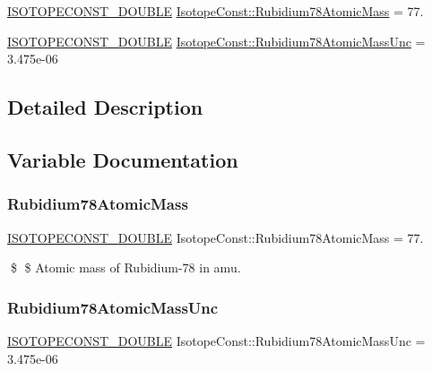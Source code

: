 \begin{DoxyCompactItemize}
\item 
\mbox{\hyperlink{group___isotope_const-_macros_ga8f45a7272ce02c0b4c65c44636ed719a}{I\+S\+O\+T\+O\+P\+E\+C\+O\+N\+S\+T\+\_\+\+D\+O\+U\+B\+LE}} \mbox{\hyperlink{group___isotope_const-_rubidium-_rb78_ga358013d0c9d295a1dc3d828d23c6f143}{Isotope\+Const\+::\+Rubidium78\+Atomic\+Mass}} = 77.
\item 
\mbox{\hyperlink{group___isotope_const-_macros_ga8f45a7272ce02c0b4c65c44636ed719a}{I\+S\+O\+T\+O\+P\+E\+C\+O\+N\+S\+T\+\_\+\+D\+O\+U\+B\+LE}} \mbox{\hyperlink{group___isotope_const-_rubidium-_rb78_ga7c18878d58c5c757e30d83a1c9a9de9a}{Isotope\+Const\+::\+Rubidium78\+Atomic\+Mass\+Unc}} = 3.\+475e-\/06
\end{DoxyCompactItemize}


\subsection{Detailed Description}


\subsection{Variable Documentation}
\mbox{\label{group___isotope_const-_rubidium-_rb78_ga358013d0c9d295a1dc3d828d23c6f143}} 
\subsubsection{\texorpdfstring{Rubidium78\+Atomic\+Mass}{Rubidium78AtomicMass}}
{\footnotesize\ttfamily \mbox{\hyperlink{group___isotope_const-_macros_ga8f45a7272ce02c0b4c65c44636ed719a}{I\+S\+O\+T\+O\+P\+E\+C\+O\+N\+S\+T\+\_\+\+D\+O\+U\+B\+LE}} Isotope\+Const\+::\+Rubidium78\+Atomic\+Mass = 77.}

\$ \$ Atomic mass of Rubidium-\/78 in amu. \mbox{\label{group___isotope_const-_rubidium-_rb78_ga7c18878d58c5c757e30d83a1c9a9de9a}} 
\subsubsection{\texorpdfstring{Rubidium78\+Atomic\+Mass\+Unc}{Rubidium78AtomicMassUnc}}
{\footnotesize\ttfamily \mbox{\hyperlink{group___isotope_const-_macros_ga8f45a7272ce02c0b4c65c44636ed719a}{I\+S\+O\+T\+O\+P\+E\+C\+O\+N\+S\+T\+\_\+\+D\+O\+U\+B\+LE}} Isotope\+Const\+::\+Rubidium78\+Atomic\+Mass\+Unc = 3.\+475e-\/06}

